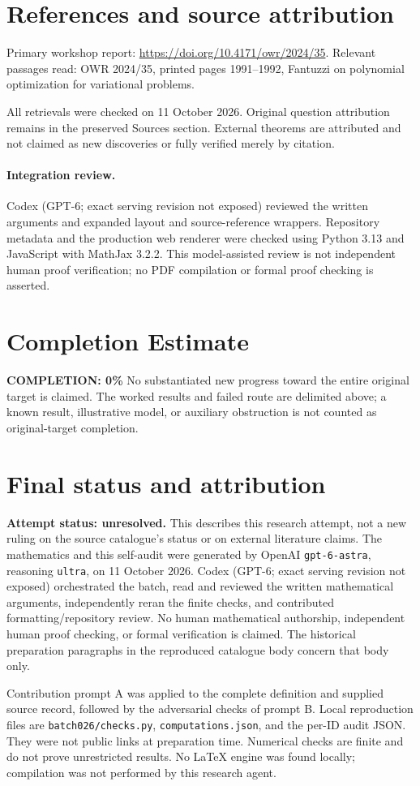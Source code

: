 \documentclass[11pt]{article}
\begin{document}
\section{References and source attribution}
Primary workshop report: \url{https://doi.org/10.4171/owr/2024/35}. Relevant passages read: OWR 2024/35, printed pages 1991--1992, Fantuzzi on polynomial optimization for variational problems.

All retrievals were checked on 11 October 2026. Original question attribution remains in the preserved Sources section. External theorems are attributed and not claimed as new discoveries or fully verified merely by citation.


\paragraph{Integration review.} Codex (GPT-6; exact serving revision not exposed) reviewed the written arguments and expanded layout and source-reference wrappers. Repository metadata and the production web renderer were checked using Python 3.13 and JavaScript with MathJax 3.2.2. This model-assisted review is not independent human proof verification; no PDF compilation or formal proof checking is asserted.

\section{Completion Estimate}
\noindent\textbf{COMPLETION: 0\%}
No substantiated new progress toward the entire original target is claimed. The worked results and failed route are delimited above; a known result, illustrative model, or auxiliary obstruction is not counted as original-target completion.

\section{Final status and attribution}
\textbf{Attempt status: unresolved.} This describes this research attempt, not a new ruling on the source catalogue's status or on external literature claims.
The mathematics and this self-audit were generated by OpenAI \texttt{gpt-6-astra}, reasoning \texttt{ultra}, on 11 October 2026. Codex (GPT-6; exact serving revision not exposed) orchestrated the batch, read and reviewed the written mathematical arguments, independently reran the finite checks, and contributed formatting/repository review. No human mathematical authorship, independent human proof checking, or formal verification is claimed. The historical preparation paragraphs in the reproduced catalogue body concern that body only.

Contribution prompt A was applied to the complete definition and supplied source record, followed by the adversarial checks of prompt B. Local reproduction files are \texttt{batch026/checks.py}, \texttt{computations.json}, and the per-ID audit JSON. They were not public links at preparation time. Numerical checks are finite and do not prove unrestricted results. No LaTeX engine was found locally; compilation was not performed by this research agent.
\end{document}
